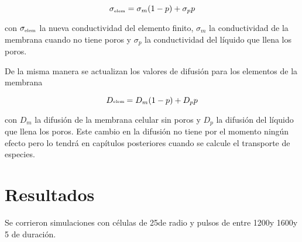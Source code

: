 \begin{equation} 
	\sigma_{\textrm{\tiny elem}} = \sigma_m (1 - p) + \sigma_p p
\end{equation} 

con $\sigma_{\textrm{\tiny elem}}$ la nueva conductividad del elemento finito, $\sigma_m$ la conductividad de la membrana cuando no tiene poros y $\sigma_p$ la conductividad del líquido que llena los poros.

De la misma manera se actualizan los valores de difusión para los elementos de la membrana 

\begin{equation} 
	D{\textrm{\tiny elem}} = D_m (1 - p) + D_p p
\end{equation} 

con $D_m$ la difusión de la membrana celular sin poros y $D_p$ la difusión del líquido que llena los poros. Este cambio en la difusión no tiene por el momento ningún efecto pero lo tendrá en capítulos posteriores cuando se calcule el transporte de especies.

\section{Resultados}

Se corrieron simulaciones con células de 25\um de radio y pulsos de entre 1200\vcm y 1600\vcm y 5 \ms de duración. 

%



